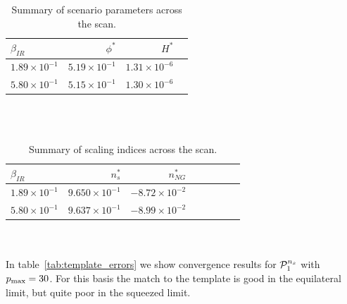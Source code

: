     \\
    \\
\begin{table}[h!]
  \begin{center}
    \begin{tabular}{lrrr}
        \toprule
        $\beta_{IR}$ &  $\phi^{*}$ &     $H^{*}$ \\
        \midrule
        $1.89\times 10^{-1}$  &  $5.19\times 10^{-1}$  &  $1.31\times 10^{-6}$\\
        $5.80\times 10^{-1}$  &  $5.15\times 10^{-1}$  &  $1.30\times 10^{-6}$\\
        \bottomrule
    \end{tabular}
    \caption{Summary of scenario parameters across the scan.}\label{tab:scan_summary_bkgd}
  \end{center}
\end{table}
    \\
    \\
\begin{table}[h!]
  \begin{center}
    \begin{tabular}{lrrrrrrr}
        \toprule
        $\beta_{IR}$ &  $n_s^{*}$ &  $n_{NG}^{*}$\\
        \midrule
        $1.89\times 10^{-1}$  &  $9.650\times 10^{-1}$  &  $-8.72\times 10^{-2}$\\
        $5.80\times 10^{-1}$  &  $9.637\times 10^{-1}$  &  $-8.99\times 10^{-2}$\\
        \bottomrule
    \end{tabular}
    \caption{Summary of scaling indices across the scan.}\label{tab:scan_summary_ns}
  \end{center}
\end{table}
\\
\\
    In table~\ref{tab:template_errors} we show convergence results for $\mathcal{P}^{n_s}_1$ with $p_\text{max}=30$.
    For this basis the match to the template is good in the equilateral limit, but quite poor in the squeezed limit.
    \\
    \\
